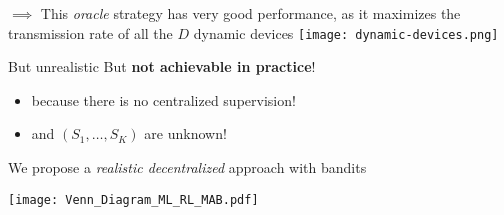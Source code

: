 \begin{frameO}

    \begin{colorblock}{}
        \(\implies\) This \emph{oracle} strategy has very good performance, as it maximizes the transmission rate of all the \(D\) dynamic devices
        \texttt{[image: dynamic-devices.png]}
    \end{colorblock}

    \vspace*{10pt}

    \begin{colorblock}{But unrealistic}
        But \textbf{not achievable in practice}!
        \begin{itemize}
            \item \alert{because there is no centralized supervision!}
            \item and $(S_1,\dots,S_K)$ are unknown!
        \end{itemize}
    \end{colorblock}

    \vspace*{10pt}

    \begin{lightblock}{We propose a \emph{realistic decentralized} approach with bandits}
        \begin{center}
            \texttt{[image: Venn\_Diagram\_ML\_RL\_MAB.pdf]}
        \end{center}


    \end{lightblock}

\end{frameO}




